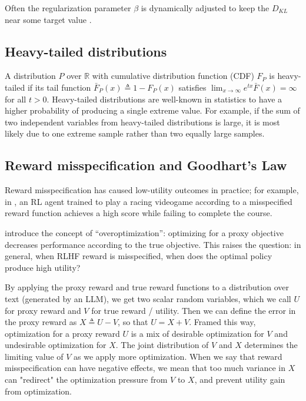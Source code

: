 \documentclass{article}
\theoremstyle{plain}
\theoremstyle{definition}
\theoremstyle{remark}
\begin{document}
Often the regularization parameter $\beta$ is dynamically adjusted to keep the $D_{KL}$ near some target value \citep{ziegler2020finetuning}.

\subsection{Heavy-tailed distributions}

A distribution $P$ over $\mathbb R$ with cumulative distribution function (CDF) $F_P$ is heavy-tailed if its tail function $\bar F_P(x) \triangleq 1 - F_P(x)$ satisfies \(
\lim _{x \rightarrow \infty} e^{t x} \bar{F}(x)=\infty\) for all $t > 0$. 
Heavy-tailed distributions are well-known in statistics to have a higher probability of producing a single extreme value. For example, if the sum of two independent variables from heavy-tailed distributions is large, it is most likely due to one extreme sample rather than two equally large samples. \citep{wierman2013catastrophes}

\subsection{Reward misspecification and Goodhart's Law\label{sec:goodhart}}


Reward misspecification has caused low-utility outcomes in practice; for example, in \citep{ClarkAmodei2016}, an RL agent trained to play a racing videogame according to a misspecified reward function achieves a high score while failing to complete the course.

\citet{gao2023scaling} introduce the concept of ``overoptimization'': optimizing for a proxy objective decreases performance according to the true objective. This raises the question: in general, when RLHF reward is misspecified, when does the optimal policy produce high utility?

By applying the proxy reward and true reward functions to a distribution over text (generated by an LLM), we get two scalar random variables, which we call $U$ for proxy reward and $V$ for true reward / utility. Then we can define the error in the proxy reward as $X \triangleq U - V$, so that $U = X + V$. Framed this way, optimization for a proxy reward $U$ is a mix of desirable optimization for $V$ and undesirable optimization for $X$. The joint distribution of $V$ and $X$ determines the limiting value of $V$ as we apply more optimization. When we say that reward misspecification can have negative effects, we mean that too much variance in $X$ can "redirect" the optimization pressure from $V$ to $X$, and prevent utility gain from optimization.
\end{document}
